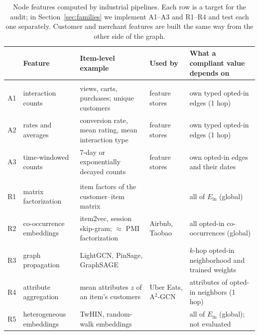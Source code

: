 \documentclass[10pt,twocolumn,letterpaper]{article}
\theoremstyle{definition}
\newcommand{\Ein}{E_{\mathrm{in}}}
\begin{document}
\begin{table}[t]
\centering\footnotesize
\setlength{\tabcolsep}{4pt}
\renewcommand{\arraystretch}{1.1}
\begin{tabular}{@{}>{\raggedright}p{0.25in}>{\raggedright}p{1.35in}>{\raggedright}p{1.9in}>{\raggedright}p{1.45in}>{\raggedright\arraybackslash}p{1.6in}@{}}
\toprule
& Feature & Item-level example & Used by & What a compliant value depends on \\
\midrule
\multicolumn{5}{@{}l}{\emph{Aggregations}}\\
A1 & interaction counts & views, carts, purchases; unique customers & feature stores~\citep{hermann2017michelangelo} & own typed opted-in edges (1 hop) \\
A2 & rates and averages & conversion rate, mean rating, mean interaction type & feature stores~\citep{hermann2017michelangelo} & own typed opted-in edges (1 hop) \\
A3 & time-windowed counts & 7-day or exponentially decayed counts & feature stores~\citep{hermann2017michelangelo} & own opted-in edges and their dates \\
\midrule
\multicolumn{5}{@{}l}{\emph{Representations}}\\
R1 & matrix factorization & item factors of the customer--item matrix & \citet{koren2009matrix} & all of $\Ein$ (global) \\
R2 & co-occurrence embeddings & item2vec, session skip-gram; $\approx$ PMI factorization & Airbnb, Taobao~\citep{grbovic2018real,wang2018billion,levy2014neural} & all opted-in co-occurrences (global) \\
R3 & graph propagation & LightGCN, PinSage, GraphSAGE & \citet{he2020lightgcn,ying2018graph,hamilton2017graphsage} & $k$-hop opted-in neighborhood and trained weights \\
R4 & attribute aggregation & mean attributes $z$ of an item's customers & Uber Eats, A$^2$-GCN~\citep{sarda2019ubereats,liu2022a2gcn} & attributes of opted-in neighbors (1 hop) \\
R5 & heterogeneous embeddings & TwHIN, random-walk embeddings & \citet{elkishky2022twhin,grover2016node2vec} & all of $\Ein$ (global); not evaluated \\
\bottomrule
\end{tabular}
\caption{Node features computed by industrial pipelines. Each row is a target for the audit; in Section~\ref{sec:families} we implement A1--A3 and R1--R4 and test each one separately. Customer and merchant features are built the same way from the other side of the graph.}
\label{tab:families}
\end{table}
\end{document}
